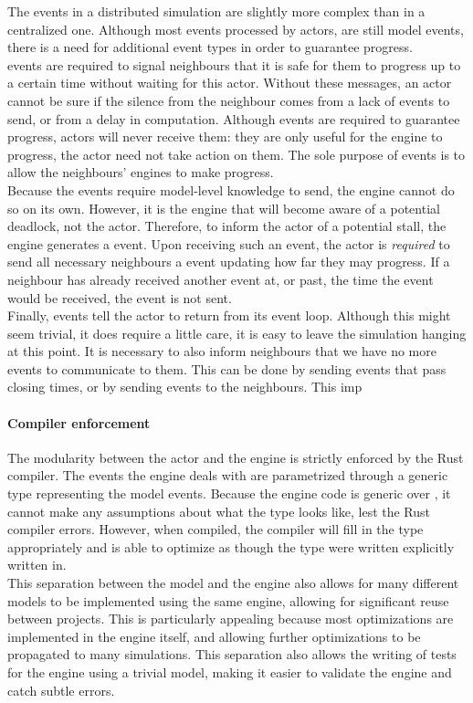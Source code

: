 The events in a distributed simulation are slightly more complex than in a centralized one.
Although most events processed by actors, are still model events, there is a need for additional event types in order to guarantee progress.\\
 events are required to signal neighbours that it is safe for them to progress up to a certain time without waiting for this actor.
Without these messages, an actor cannot be sure if the silence from the neighbour comes from a lack of events to send, or from a delay in computation.
Although  events are required to guarantee progress, actors will never receive them: they are only useful for the engine to progress, the actor need not take action on them.
The sole purpose of  events is to allow the neighbours' engines to make progress.\\
Because the  events require model-level knowledge to send, the engine cannot do so on its own.
However, it is the engine that will become aware of a potential deadlock, not the actor.
Therefore, to inform the actor of a potential stall, the engine generates a  event.
Upon receiving such an event, the actor is \emph{required} to send all necessary neighbours a  event updating how far they may progress.
If a neighbour has already received another event at, or past, the time the  event would be received, the  event is not sent.\\ %
Finally,  events tell the actor to return from its event loop.
Although this might seem trivial, it does require a little care, it is easy to leave the simulation hanging at this point.
It is necessary to also inform neighbours that we have no more events to communicate to them.
This can be done by sending  events that pass closing times, or by sending  events to the neighbours.
This imp

\paragraph{Compiler enforcement}
The modularity between the actor and the engine is strictly enforced by the Rust compiler.
The events the engine deals with are parametrized through a generic type  representing the model events.
Because the engine code is generic over , it cannot make any assumptions about what the type looks like, lest the Rust compiler errors.
However, when compiled, the compiler will fill in the type appropriately and is able to optimize as though the type were written explicitly written in.\\
This separation between the model and the engine also allows for many different models to be implemented using the same engine, allowing for significant reuse between projects.
This is particularly appealing because most optimizations are implemented in the engine itself, and allowing further optimizations to be propagated to many simulations.
This separation also allows the writing of tests for the engine using a trivial model, making it easier to validate the engine and catch subtle errors.

